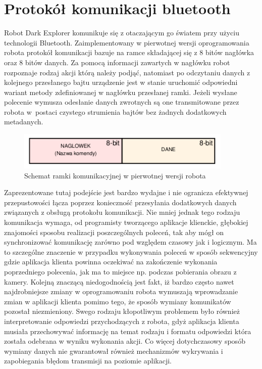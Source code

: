 \section{Protokół komunikacji bluetooth}
\label{sec:ch05_s01_comm}
Robot Dark Explorer komunikuje się z otaczającym go światem przy użyciu
technologii Bluetooth. Zaimplementowany w pierwotnej wersji oprogramowania
robota protokół komunikacji bazuje na ramce składającej się z 8 bitów nagłówka oraz 8 bitów
danych. Za pomocą informacji zawartych w nagłówku robot rozpoznaje
rodzaj akcji którą należy podjąć, natomiast po odczytaniu danych z kolejnego
przesłanego bajtu urządzenie jest w stanie uruchomić odpowiedni wariant metody
zdefiniowanej w nagłówku przesłanej ramki. Jeżeli wysłane polecenie wymusza
odesłanie danych zwrotnych są one transmitowane przez robota w~postaci czystego
strumienia bajtów bez żadnych dodatkowych metadanych.

\begin{figure}[h!]
 \centering
 \includegraphics[height=18mm]{../images/ch05/old_req_schema.png}
 \caption{Schemat ramki komunikacyjnej w pierwotnej wersji robota}
 \label{fig:OldCommFrame}
\end{figure}

Zaprezentowane tutaj podejście jest bardzo wydajne i nie ogranicza efektywnej
przepustowości łącza poprzez konieczność przesyłania dodatkowych danych
związanych z obsługą protokołu komunikacji. Nie mniej jednak tego rodzaju
komunikacja wymaga, od programisty tworzącego aplikacje klienckie, głębokiej
znajomości sposobu realizacji poszczególnych poleceń, tak aby mógł on
synchronizować komunikację zarówno pod względem czasowy jak i logicznym. Ma to
szczególne znaczenie w przypadku wykonywania poleceń w sposób sekwencyjny gdzie
aplikacja klienta powinna oczekiwać na zakończenie wykonania poprzedniego
polecenia, jak ma to miejsce np. podczas pobierania obrazu z kamery. Kolejną
znaczącą niedogodnością jest fakt, iż bardzo często nawet najdrobniejsze zmiany w
oprogramowaniu robota wymuszają wprowadzanie zmian w aplikacji klienta pomimo
tego, że sposób wymiany komunikatów pozostał niezmieniony. Swego rodzaju
kłopotliwym problemem było również interpretowanie odpowiedzi przychodzących z
robota, gdyż aplikacja klienta musiała przechowywać informację na temat rodzaju i
formatu odpowiedzi która została odebrana w wyniku wykonania akcji. Co więcej
dotychczasowy sposób wymiany danych nie gwarantował również mechanizmów
wykrywania i zapobiegania błędom transmisji na poziomie aplikacji.

